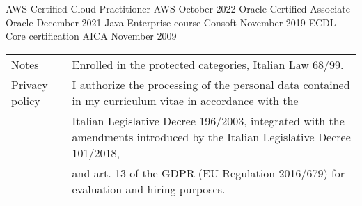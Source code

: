\documentclass[]{style}
\begin{document}
\begin{cvhonors}
	\cvhonor
	{AWS Certified Cloud Practitioner}
	{}
	{AWS}
	{October 2022}
	\cvhonor
	{Oracle Certified Associate}
	{}
	{Oracle}
	{December 2021}
	\cvhonor
	{Java Enterprise course}
	{}
	{Consoft}
	{November 2019}
	\cvhonor
	{ECDL Core certification}
	{}
	{AICA}
	{November 2009}
\end{cvhonors}

\makecvfooter
{{\def\arraystretch{1.15}{\begin{tabular}{ l l }
		Notes  & { Enrolled in the protected categories, Italian Law 68/99. } \\
		Privacy policy  & { I authorize the processing of the personal data contained in my curriculum vitae in accordance with the } \\
		& { Italian Legislative Decree 196/2003, integrated with the amendments introduced by the Italian Legislative Decree 101/2018, } \\
		& { and art. 13 of the GDPR (EU Regulation 2016/679) for evaluation and hiring purposes. } \\
		\end{tabular}}}}
{}
{}

\
\end{document}
